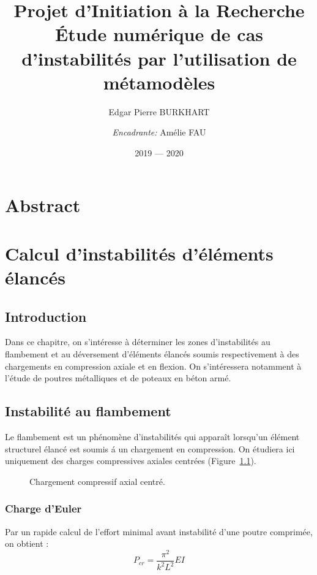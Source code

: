 \documentclass{report}
\title{{\small Projet d'Initiation à la Recherche}\\Étude numérique de cas d'instabilités par l'utilisation de métamodèles}
\author{Edgar Pierre BURKHART\and\textit{Encadrante:} Amélie FAU}
\date{2019 --- 2020}
\begin{document}
\maketitle

\chapter*{Abstract}

\tableofcontents

\chapter{Calcul d'instabilités d'éléments élancés}
\section{Introduction}
Dans ce chapitre, on s'intéresse à déterminer les zones d'instabilités au flambement et au déversement d'éléments élancés soumis respectivement à des chargements en compression axiale et en flexion.
On s'intéressera notamment à l'étude de poutres métalliques et de poteaux en béton armé.

\section{Instabilité au flambement}
Le flambement est un phénomène d'instabilités qui apparaît lorsqu'un élément structurel élancé est soumis á un chargement en compression. On étudiera ici uniquement des charges compressives axiales centrées (Figure~\ref{fig:flamb}).

\begin{figure}
    \centering
    \caption{Chargement compressif axial centré.}\label{fig:flamb}
\end{figure}

\subsection{Charge d'Euler}
Par un rapide calcul de l'effort minimal avant instabilité d'une poutre comprimée, on obtient \cite{coursfla}:
\begin{dmath}
    P_{cr}=\frac{\pi^2}{k^2L^2}EI
\end{dmath}
\end{document}
